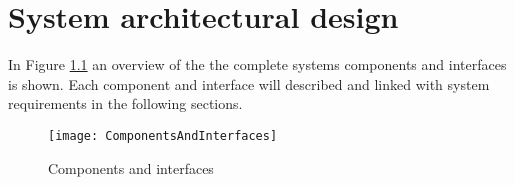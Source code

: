 \documentclass[Main]{subfiles}
\begin{document}
\chapter{System architectural design}
In Figure \ref{fig:ComponentsAndInterfaces} an overview of the the complete systems components and interfaces is shown. Each component and interface will described and linked with system requirements in the following sections.

\begin{figure}[H]
\centering
\texttt{[image: ComponentsAndInterfaces]}
\caption{Components and interfaces}
\label{fig:ComponentsAndInterfaces}
\end{figure}


\newpage

\newpage

\end{document}
